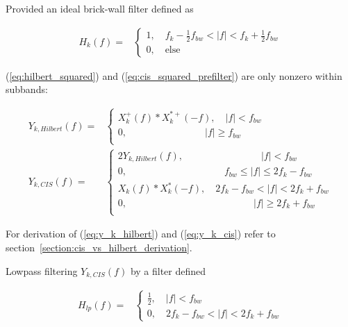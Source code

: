 \documentclass [11pt, proquest,oneside] {ganter_thesis}[2015/03/03]
\begin{document}
Provided an ideal brick-wall filter defined as

\begin{align}
\label{eq:ideal_brickwall_cis_vs_hilbert}
H_k(f) =& \left\{
                \begin{array}{ll}
                1, \quad f_k - \frac{1}{2} f_{bw} < |f| < f_k + \frac{1}{2} f_{bw} \\
                0, \quad \mathrm{else}
                \end{array}
              \right.
\end{align}

(\ref{eq:hilbert_squared}) and (\ref{eq:cis_squared_prefilter}) are only nonzero within subbands:

\begin{align}
\label{eq:y_k_hilbert}
Y_{k,Hilbert}(f) =& \left\{
			 \begin{array}{ll}
X^+_{k}(f) * X^{*+}_{k}(-f), \quad |f| < f_{bw} \\
0, \qquad \qquad \qquad \qquad |f| \geq f_{bw} \\
                \end{array}
               \right. \\
\label{eq:y_k_cis}
Y_{k,CIS}(f) =& \left\{
			 \begin{array}{ll}
2Y_{k,Hilbert}(f), \quad \qquad \qquad \qquad \quad |f| < f_{bw} \\
0, \qquad \qquad \qquad \qquad \qquad  f_{bw} \leq |f| \leq 2f_k - f_{bw}  \\
X_{k}(f) * X^*_{k}(-f), \quad 2f_k - f_{bw} < |f| < 2f_k + f_{bw} \\
0, \qquad \qquad \qquad \qquad \qquad \quad \qquad |f| \geq 2f_k + f_{bw}  \\
                \end{array}
               \right.
\end{align}

For derivation of (\ref{eq:y_k_hilbert}) and (\ref{eq:y_k_cis}) refer to section~\ref{section:cis_vs_hilbert_derivation}.

Lowpass filtering $Y_{k,CIS}(f)$ by a filter defined

\begin{align}
H_{lp}(f) =& \left\{
                \begin{array}{ll}
                \frac{1}{2}, \quad |f| < f_{bw} \\
                 0, \quad 2f_k - f_{bw} < |f| < 2f_k + f_{bw}
                \end{array}
              \right.
\end{align}
\end{document}
